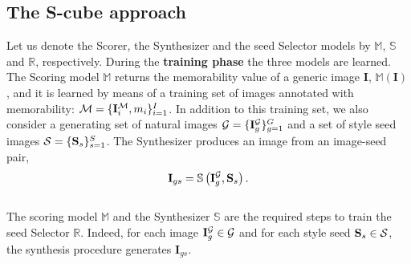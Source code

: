 \documentclass{sig-alternate-05-2015}
\begin{document}
\subsection{The S-cube approach}
\label{sec:scube}
Let us denote the Scorer, the Synthesizer and the seed Selector models by $\mathbb{M}$,  $\mathbb{S}$ and $\mathbb{R}$, respectively. During the \textbf{training phase} the three models are learned.
The Scoring model $\mathbb{M}$ returns the memorability value of a generic image $\mathbf{I}$, $\mathbb{M}(\mathbf{I})$, and it is learned by means of a training set of images annotated with memorability: ${\cal M}=\{\mathbf{I}_i^{\cal M},m_i\}_{i=1}^I$. In addition to this training set, we also consider a generating set of natural images ${\cal G}=\{\mathbf{I}_g^{\cal G}\}_{g=1}^G$ and a set of style seed images ${\cal S}=\{\mathbf{S}_s\}_{s=1}^S$. The Synthesizer produces an image from an image-seed pair, 
\begin{equation}
    \mathbf{I}_{gs} = \mathbb{S}\left(\mathbf{I}_g^{\cal G},\mathbf{S}_s\right).
\end{equation}\\
The scoring model $\mathbb{M}$ and the Synthesizer $\mathbb{S}$ are the required steps to train the seed Selector $\mathbb{R}$. Indeed, for each  image $\mathbf{I}_g^{\cal G}\in{\cal G}$ and for each style seed $\mathbf{S}_s\in{\cal S}$, the synthesis procedure generates $\mathbf{I}_{gs}$.
\end{document}
